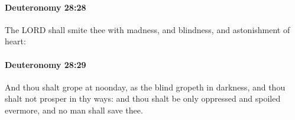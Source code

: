 		\paragraph{Deuteronomy 28:28} %
			\label{DEUTERONOMY-28-28}

			The LORD shall smite thee with madness, and blindness, and astonishment of heart:


		\paragraph{Deuteronomy 28:29} %
			\label{DEUTERONOMY-28-29}

			And thou shalt grope at noonday, as the blind gropeth in darkness, and thou shalt not prosper in thy ways: and thou shalt be only oppressed and spoiled evermore, and no man shall save thee.


